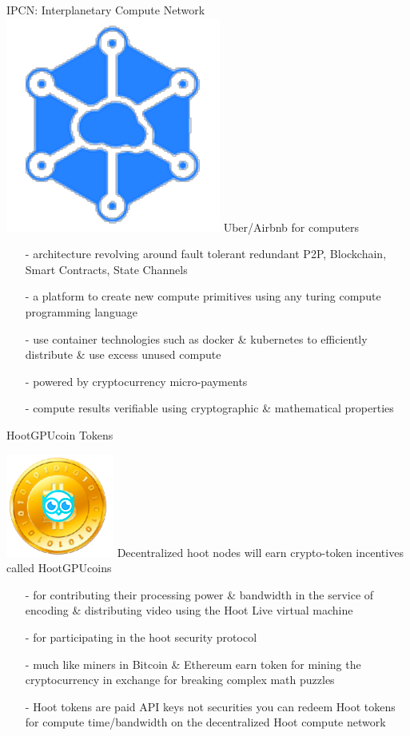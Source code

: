 \documentclass[10pt]{beamer}
\begin{document}
\begin{frame}[t]{IPCN: Interplanetary Compute Network}
	\includegraphics[scale=.3]{static/ipcn-p2p} Uber/Airbnb for computers
 \begin{itemize}
  \item[-]architecture revolving around fault tolerant redundant P2P, Blockchain, Smart Contracts, State Channels
  \item[-]a platform to create new compute primitives using any turing compute programming language
  \item[-]use container technologies such as docker \& kubernetes to efficiently distribute \& use excess unused compute
  \item[-]powered by cryptocurrency micro-payments
  \item[-]compute results verifiable using cryptographic \& mathematical properties
 \end{itemize}
\end{frame}

\begin{frame}[t]{ HootGPUcoin Tokens }
 
 
\includegraphics[scale=0.4]{static/hootcoin}  Decentralized hoot nodes will earn crypto-token incentives called HootGPUcoins 
 

 \begin{itemize}
 \item[-]for contributing their processing power \& bandwidth in the service of encoding \& distributing video using the Hoot Live virtual machine 
 \item[-]for participating in the hoot security protocol
 \item[-]much like miners in Bitcoin \& Ethereum earn token for mining the cryptocurrency in exchange for breaking complex math puzzles
 \item[-]Hoot tokens are paid API keys not securities you can redeem Hoot tokens for compute time/bandwidth on the decentralized Hoot compute network
 \end{itemize}
 
 
 
\end{frame}
\end{document}

